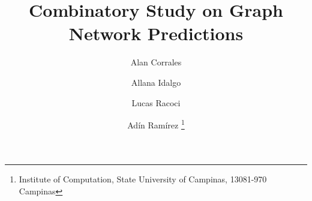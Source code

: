 \documentclass[11pt,twoside]{article}
\begin{document}





\TRMakeCover


%
\pagestyle{myheadings}


\title{Combinatory Study on Graph Network Predictions}

\author{
    Alan Corrales
    \and Allana Idalgo
    \and Lucas Racoci
    \and Adín Ramírez
    \thanks{Institute of Computation, State University of Campinas, 13081-970  Campinas}
}

\date{}

\maketitle








{\small



}


\end{document}
